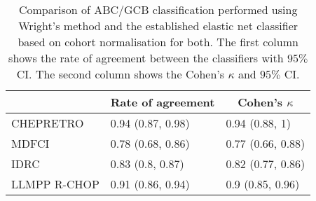\begin{table}[!tbp]
{\small
\caption{Comparison of ABC/GCB classification performed using Wright's
method and the established elastic net classifier based on cohort normalisation
for both. The first column shows the rate of agreement between the classifiers
with $95\%$ CI. The second column shows the Cohen's $\kappa$ and $95\%$ CI.\label{tab:ABCGCBclassifier}} 
\begin{center}
\begin{tabular}{lll}
\hline\hline
\multicolumn{1}{l}{}&\multicolumn{1}{c}{Rate of agreement}&\multicolumn{1}{c}{Cohen's $\kappa$}\tabularnewline
\hline
CHEPRETRO&0.94 (0.87, 0.98)&0.94 (0.88, 1)\tabularnewline
MDFCI&0.78 (0.68, 0.86)&0.77 (0.66, 0.88)\tabularnewline
IDRC&0.83 (0.8, 0.87)&0.82 (0.77, 0.86)\tabularnewline
LLMPP R-CHOP&0.91 (0.86, 0.94)&0.9 (0.85, 0.96)\tabularnewline
\hline
\end{tabular}\end{center}}

\end{table}
